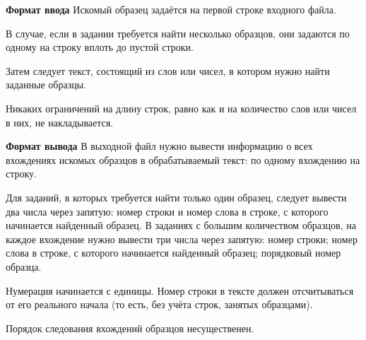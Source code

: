 

\textbf{Формат ввода}
Искомый образец задаётся на первой строке входного файла.

В случае, если в задании требуется найти несколько образцов, они задаются по одному на строку вплоть до пустой строки.

Затем следует текст, состоящий из слов или чисел, в котором нужно найти заданные образцы.

Никаких ограничений на длину строк, равно как и на количество слов или чисел в них, не накладывается.

\textbf{Формат вывода}
В выходной файл нужно вывести информацию о всех вхождениях искомых образцов в обрабатываемый текст: по одному вхождению на строку.

Для заданий, в которых требуется найти только один образец, следует вывести два числа через запятую: номер строки и номер слова в строке, с которого начинается найденный образец. В заданиях с большим количеством образцов, на каждое вхождение нужно вывести три числа через запятую: номер строки; номер слова в строке, с которого начинается найденный образец; порядковый номер образца.

Нумерация начинается с единицы. Номер строки в тексте должен отсчитываться от его реального начала (то есть, без учёта строк, занятых образцами).

Порядок следования вхождений образцов несущественен.

\pagebreak